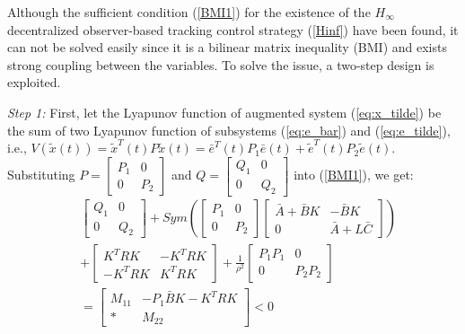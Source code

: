 \documentclass{ieeeaccess}
\begin{document}
Although the sufficient condition (\ref{BMI1}) for the existence of the $H_\infty$ decentralized observer-based tracking control strategy (\ref{Hinf}) have been found, it can not be solved easily since it is a bilinear matrix inequality (BMI) and exists strong coupling between the variables. To solve the issue, a two-step design is exploited.

\textit{Step 1:} First, let the Lyapunov function of augmented system (\ref{eq:x_tilde}) be the sum of two Lyapunov function of subsystems (\ref{eq:e_bar}) and (\ref{eq:e_tilde}), i.e., $V(\tilde{x}(t))=\tilde{x}^T(t)P\tilde{x}(t)=\bar{e}^T(t)P_1\bar{e}(t)+\tilde{e}^T(t)P_2\tilde{e}(t)$. Substituting $P=\begin{bmatrix}
    P_1 & 0 \\ 0 & P_2
\end{bmatrix}$ and $Q=\begin{bmatrix}
    Q_1 & 0 \\ 0 & Q_2
\end{bmatrix}$ into (\ref{BMI1}), we get:
\begin{equation} \label{eq:M}
    \begin{split}
        & \begin{bmatrix}
            Q_1 & 0 \\ 0 & Q_2
        \end{bmatrix} + Sym(\begin{bmatrix}
            P_1 & 0 \\ 0 & P_2
        \end{bmatrix}\begin{bmatrix}
            \bar{A}+\bar{B}K & -\bar{B}K \\ 0 & \bar{A}+L\bar{C}
        \end{bmatrix})  \\
        & + \begin{bmatrix}
            K^TRK & -K^TRK \\ -K^TRK & K^TRK
        \end{bmatrix} + \frac{1}{\rho^2}\begin{bmatrix}
            P_1P_1 & 0 \\ 0 & P_2P_2
        \end{bmatrix} \\
        & = \begin{bmatrix}
            M_{11} & -P_1\bar{B}K - K^TRK \\ * & M_{22}
        \end{bmatrix} < 0
    \end{split}
\end{equation}
\end{document}
